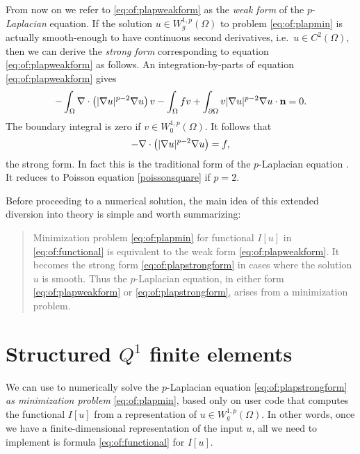 From now on we refer to \eqref{eq:of:plapweakform} as the \emph{weak form} of the $p$-\emph{Laplacian} equation.  If the solution $u \in W_g^{1,p}(\Omega)$ to problem \eqref{eq:of:plapmin} is actually smooth-enough to have continuous second derivatives, i.e.~$u \in C^2(\Omega)$, then we can derive the \emph{strong form} corresponding to equation \eqref{eq:of:plapweakform} as follows.  An integration-by-parts \citep[Appendix C]{Evans2010} of equation \eqref{eq:of:plapweakform} gives
    $$-\int_\Omega \nabla\cdot\left(|\nabla u|^{p-2} \nabla u\right) v - \int_\Omega f v + \int_{\partial \Omega} v |\nabla u|^{p-2} \nabla u \cdot \mathbf{n} = 0.$$
The boundary integral is zero if $v\in W_0^{1,p}(\Omega)$.  It follows that
\begin{equation}
- \nabla\cdot\left(|\nabla u|^{p-2} \nabla u\right) = f,
\label{eq:of:plapstrongform}
\end{equation}
the strong form.  In fact this is the traditional form of the $p$-Laplacian equation \citep[section 1.2]{Evans2010}.  It reduces to Poisson equation \eqref{poissonsquare} if $p=2$.

Before proceeding to a numerical solution, the main idea of this extended diversion into theory is simple and worth summarizing:
\begin{quote}
Minimization problem \eqref{eq:of:plapmin} for functional $I[u]$ in \eqref{eq:of:functional} is equivalent to the weak form \eqref{eq:of:plapweakform}.  It becomes the strong form \eqref{eq:of:plapstrongform} in cases where the solution $u$ is smooth.  Thus the $p$-Laplacian equation, in either form \eqref{eq:of:plapweakform} or \eqref{eq:of:plapstrongform}, arises from a minimization problem.
\end{quote}


\section{Structured $Q^1$ finite elements}

We can use \PETSc to numerically solve the $p$-Laplacian equation \eqref{eq:of:plapstrongform} \emph{as minimization problem} \eqref{eq:of:plapmin}, based only on user code that computes the functional $I[u]$ from a representation of $u \in W_g^{1,p}(\Omega)$.  In other words, once we have a finite-dimensional representation of the input $u$, all we need to implement is formula \eqref{eq:of:functional} for $I[u]$.

